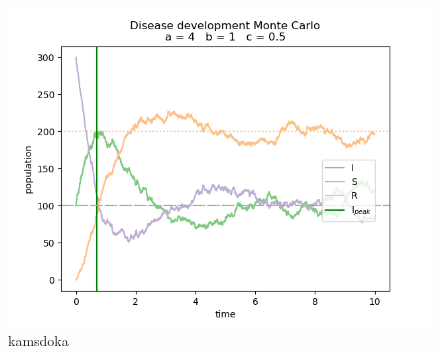 \begin{figure}[!h]
    \centering
    \includegraphics[scale=0.5]{plots/MC_solver_getstd_a_4_b_1_c_0.5_SIR.png}
    \caption{kamsdoka}
    \label{fig:default}
\end{figure}